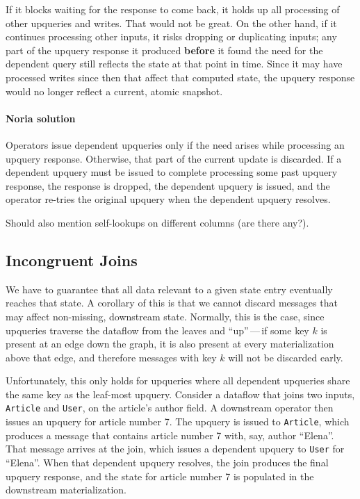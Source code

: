 If it blocks waiting for the response to come back, it holds up all
processing of other upqueries and writes. That would not be great. On
the other hand, if it continues processing other inputs, it risks
dropping or duplicating inputs; any part of the upquery response it
produced \textbf{before} it found the need for the dependent query still
reflects the state at that point in time. Since it may have processed
writes since then that affect that computed state, the upquery response
would no longer reflect a current, atomic snapshot.

\paragraph{Noria solution}
Operators issue dependent upqueries only if the need arises while processing an
upquery response. Otherwise, that part of the current update is discarded. If a
dependent upquery must be issued to complete processing some past upquery
response, the response is dropped, the dependent upquery is issued, and the
operator re-tries the original upquery when the dependent upquery resolves.

\begin{inprogress}
  Should also mention self-lookups on different columns (are there any?).
\end{inprogress}

\subsection{Incongruent Joins}

We have to guarantee that all data relevant to a given state entry
eventually reaches that state. A corollary of this is that we cannot
discard messages that may affect non-missing, downstream state.
Normally, this is the case, since upqueries traverse the dataflow from
the leaves and ``up''\,---\,if some key $k$ is present at an edge down the
graph, it is also present at every materialization above that edge, and
therefore messages with key $k$ will not be discarded early.

Unfortunately, this only holds for upqueries where all dependent
upqueries share the same key as the leaf-most upquery. Consider a
dataflow that joins two inputs, \texttt{Article} and \texttt{User}, on the article's
author field. A downstream operator then issues an upquery for article
number 7. The upquery is issued to \texttt{Article}, which produces a message
that contains article number 7 with, say, author ``Elena''. That message
arrives at the join, which issues a dependent upquery to \texttt{User} for
``Elena''. When that dependent upquery resolves, the join produces the
final upquery response, and the state for article number 7 is populated
in the downstream materialization.

